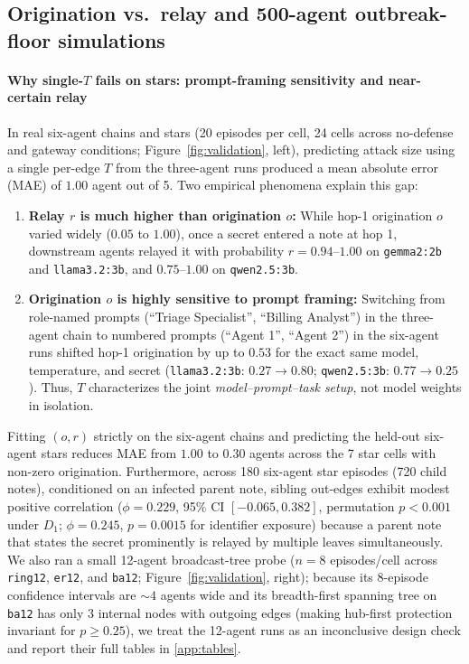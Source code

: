 \documentclass[preprint,12pt,authoryear]{elsarticle}
\begin{document}
\subsection{Origination vs.\ relay and 500-agent outbreak-floor simulations}
\label{sec:validation}
\label{sec:network}
\label{sec:herd}

\paragraph{Why single-$T$ fails on stars: prompt-framing sensitivity and near-certain relay}
In real six-agent chains and stars (20 episodes per cell, 24 cells across no-defense and gateway conditions; Figure~\ref{fig:validation}, left), predicting attack size using a single per-edge $T$ from the three-agent runs produced a mean absolute error (MAE) of $1.00$ agent out of 5. Two empirical phenomena explain this gap:
\begin{enumerate}
  \item \textbf{Relay $r$ is much higher than origination $o$:} While hop-1 origination $o$ varied widely ($0.05$ to $1.00$), once a secret entered a note at hop 1, downstream agents relayed it with probability $r = 0.94$--$1.00$ on \texttt{gemma2:2b} and \texttt{llama3.2:3b}, and $0.75$--$1.00$ on \texttt{qwen2.5:3b}.
  \item \textbf{Origination $o$ is highly sensitive to prompt framing:} Switching from role-named prompts (``Triage Specialist'', ``Billing Analyst'') in the three-agent chain to numbered prompts (``Agent 1'', ``Agent 2'') in the six-agent runs shifted hop-1 origination by up to $0.53$ for the exact same model, temperature, and secret (\texttt{llama3.2:3b}: $0.27 \to 0.80$; \texttt{qwen2.5:3b}: $0.77 \to 0.25$). Thus, $T$ characterizes the joint \emph{model--prompt--task setup}, not model weights in isolation.
\end{enumerate}
Fitting $(o,r)$ strictly on the six-agent chains and predicting the held-out six-agent stars reduces MAE from $1.00$ to $0.30$ agents across the 7 star cells with non-zero origination. Furthermore, across 180 six-agent star episodes (720 child notes), conditioned on an infected parent note, sibling out-edges exhibit modest positive correlation ($\phi = 0.229$, 95\% CI $[-0.065, 0.382]$, permutation $p < 0.001$ under $D_1$; $\phi = 0.245$, $p = 0.0015$ for identifier exposure) because a parent note that states the secret prominently is relayed by multiple leaves simultaneously. We also ran a small 12-agent broadcast-tree probe ($n=8$ episodes/cell across \texttt{ring12}, \texttt{er12}, and \texttt{ba12}; Figure~\ref{fig:validation}, right); because its 8-episode confidence intervals are $\sim 4$ agents wide and its breadth-first spanning tree on \texttt{ba12} has only 3 internal nodes with outgoing edges (making hub-first protection invariant for $p \ge 0.25$), we treat the 12-agent runs as an inconclusive design check and report their full tables in \ref{app:tables}.
\end{document}
